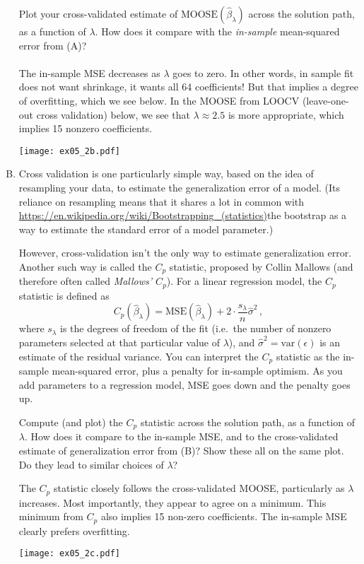 \documentclass{article}
\begin{document}
\begin{enumerate}[(A)]
Plot your cross-validated estimate of $\mathrm{MOOSE}(\hat{\beta}_{\lambda})$ across the solution path, as a function of $\lambda$.  How does it compare with the \textit{in-sample} mean-squared error from (A)?\\
\\
\color{blue}
The in-sample MSE decreases as $\lambda$ goes to zero. In other words, in sample fit does not want shrinkage, it wants all 64 coefficients! But that implies a degree of overfitting, which we see below. In the MOOSE from LOOCV (leave-one-out cross validation) below, we see that $\lambda \approx 2.5$ is more appropriate, which implies 15 nonzero coefficients.
\begin{center}
\texttt{[image: ex05\_2b.pdf]}
\end{center}
\color{black}

\item Cross validation is one particularly simple way, based on the idea of resampling your data, to estimate the generalization error of a model.  (Its reliance on resampling means that it shares a lot in common with \url{https://en.wikipedia.org/wiki/Bootstrapping_(statistics)}{the bootstrap} as a way to estimate the standard error of a model parameter.)

However, cross-validation isn't the only way to estimate generalization error.  Another such way is called the $C_p$ statistic, proposed by Collin Mallows (and therefore often called \textit{Mallows' $C_p$}).  For a linear regression model, the $C_p$ statistic is defined as
$$
C_p(\hat{\beta}_\lambda) = \mathrm{MSE}(\hat \beta_{\lambda}) + 2 \cdot \frac{s_{\lambda}}{n} \hat \sigma^2 \, ,
$$
where $s_{\lambda}$ is the degrees of freedom of the fit (i.e.~the number of nonzero parameters selected at that particular value of $\lambda$), and $\hat \sigma^2 = \mathrm{var}(\epsilon)$ is an estimate of the residual variance.  You can interpret the $C_p$ statistic as the in-sample mean-squared error, plus a penalty for in-sample optimism.  As you add parameters to a regression model, MSE goes down and the penalty goes up. 

Compute (and plot) the $C_p$ statistic across the solution path, as a function of $\lambda$.  How does it compare to the in-sample MSE, and to the cross-validated estimate of generalization error from (B)?  Show these all on the same plot.  Do they lead to similar choices of $\lambda$?

\color{blue}
The $C_p$ statistic closely follows the cross-validated MOOSE, particularly as $\lambda$ increases. Most importantly, they appear to agree on a minimum. This minimum from $C_p$ also implies 15 non-zero coefficients. The in-sample MSE clearly prefers overfitting. 
\begin{center}
\texttt{[image: ex05\_2c.pdf]}
\end{center}
\color{black}


\end{enumerate}
\end{document}
